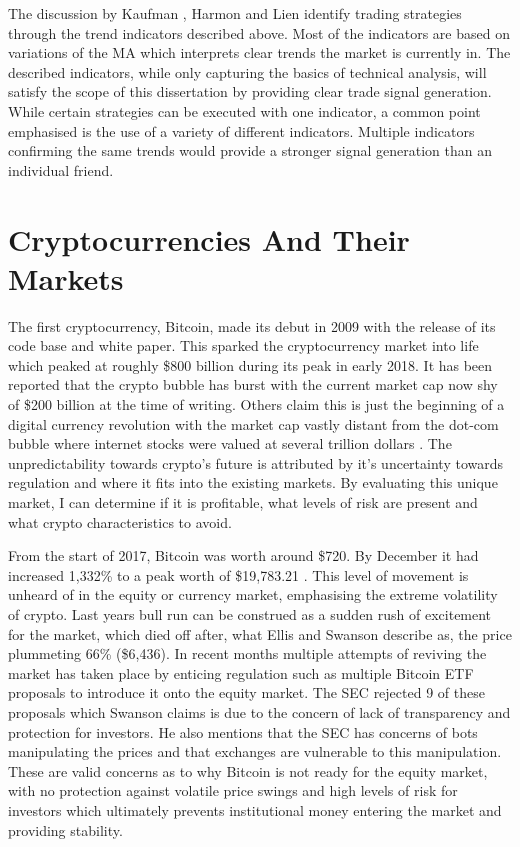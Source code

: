 The discussion by Kaufman \cite{BOOK:Kaufman:2013}, Harmon \cite{BOOK:Harmon:2014} and Lien \cite{BOOK:Lien:2016} identify trading strategies through the trend indicators described above. Most of the indicators are based on variations of the MA which interprets clear trends the market is currently in. The described indicators, while only capturing the basics of technical analysis, will satisfy the scope of this dissertation by providing clear trade signal generation. While certain strategies can be executed with one indicator, a common point emphasised is the use of a variety of different indicators. Multiple indicators confirming the same trends would provide a stronger signal generation than an individual friend. 

\section{Cryptocurrencies And Their Markets}
\label{sec:related:cryptoAndTheirMarkets}

The first cryptocurrency, Bitcoin, made its debut in 2009 with the release of its code base and white paper. This sparked the cryptocurrency market into life which peaked at roughly \$800 billion during its peak in early 2018. It has been reported that the crypto bubble has burst with the current market cap now shy of \$200 billion at the time of writing. Others claim this is just the beginning of a digital currency revolution with the market cap vastly distant from the dot-com bubble where internet stocks were valued at several trillion dollars \cite{ART:Kharpal:2018}. The unpredictability towards crypto's future is attributed by it's uncertainty towards regulation and where it fits into the existing markets. By evaluating this unique market, I can determine if it is profitable, what levels of risk are present and what crypto characteristics to avoid.

From the start of 2017, Bitcoin was worth around \$720. By December it had increased 1,332\% to a peak worth of \$19,783.21 \cite{ART:ELLIS:2018}. This level of movement is unheard of in the equity or currency market, emphasising the extreme volatility of crypto. Last years bull run can be construed as a sudden rush of excitement for the market, which died off after, what Ellis and Swanson \cite{ART:ELLIS:2018} describe as, the price plummeting 66\% (\$6,436). In recent months multiple attempts of reviving the market has taken place by enticing regulation such as multiple Bitcoin ETF proposals to introduce it onto the equity market. The SEC rejected 9 of these proposals which Swanson \cite{ART:ELLIS:2018} claims is due to the concern of lack of transparency and protection for investors. He also mentions that the SEC has concerns of bots manipulating the prices and that exchanges are vulnerable to this manipulation. These are valid concerns as to why Bitcoin is not ready for the equity market, with no protection against volatile price swings and high levels of risk for investors which ultimately prevents institutional money entering the market and providing stability. 

